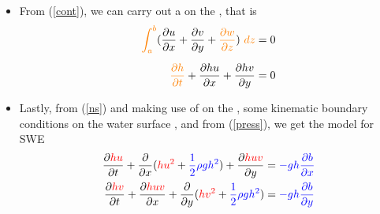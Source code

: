 \begin{frame}
\vspace{-3mm}
\begin{itemize}
\item<1-> From (\ref{cont}), we can carry out a  on the , that is 
\begin{align}
\textcolor{orange}{\int_a^b} (\frac{\partial u}{\partial x} + \frac{\partial v}{\partial y} + \textcolor{orange}{\frac{\partial w}{\partial z}})\ \textcolor{orange}{dz} &= 0 \nonumber \\[0.2cm]
\textcolor{orange}{\frac{\partial h}{\partial t}} + \frac{\partial hu}{\partial x} + \frac{\partial hv}{\partial y} &= 0
\end{align}
\item<2-> Lastly, from (\ref{ns}) and making use of  on the , some kinematic boundary conditions on the water surface \cite{depthAv}, and from (\ref{press}), we get the model for SWE
\begin{align}
\frac{\partial \textcolor{red}{hu}}{\partial t} + \frac{\partial}{\partial x}(\textcolor{red}{hu^2} + \textcolor{blue}{\frac{1}{2}\rho g h^2}) + \frac{\partial \textcolor{red}{huv}}{\partial y} &= \textcolor{blue}{- gh\frac{\partial b}{\partial x}} \\
\frac{\partial \textcolor{red}{hv}}{\partial t} + \frac{\partial \textcolor{red}{huv}}{\partial x} + \frac{\partial}{\partial y}(\textcolor{red}{hv^2} + \textcolor{blue}{\frac{1}{2}\rho g h^2})&= \textcolor{blue}{- gh\frac{\partial b}{\partial y} }
\end{align}
\end{itemize}
\end{frame}
\clearpage

